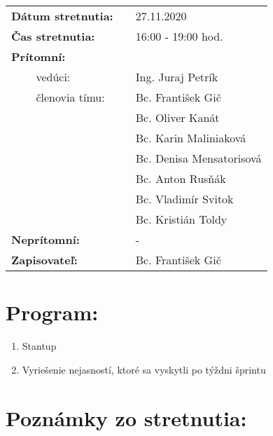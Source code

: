 \documentclass{article}
\begin{document}
    

    \begin{table}[h]
        \begin{tabular}{lllll}
            \multicolumn{3}{l}{\textbf{Dátum stretnutia:}} & & 27.11.2020 \\
            \multicolumn{3}{l}{\textbf{Čas stretnutia:}} & & 16:00 - 19:00 hod. \\
            \multicolumn{3}{l}{\textbf{Prítomní:}} \\
            & & vedúci: & & Ing. Juraj Petrík \\
            & & členovia tímu: & & Bc. František Gič  \\
            & & & & Bc. Oliver Kanát \\
            & & & & Bc. Karin Maliniaková \\
            & & & & Bc. Denisa Mensatorisová \\
            & & & & Bc. Anton Rusňák \\
            & & & & Bc. Vladimír Svitok \\
            & & & & Bc. Kristián Toldy \\
            \multicolumn{3}{l}{\textbf{Neprítomní:}} & & -\\
            \multicolumn{3}{l}{\textbf{Zapisovateľ:}} & & Bc. František Gič \\
        \end{tabular}
        \label{tab:grades}
    \end{table}

    \section*{Program:}
    
    \begin{enumerate}
        \item Stantup
        \item Vyriešenie nejasností, ktoré sa vyskytli po týždni šprintu
    \end{enumerate}

    \section*{Poznámky zo stretnutia:}
\end{document}
